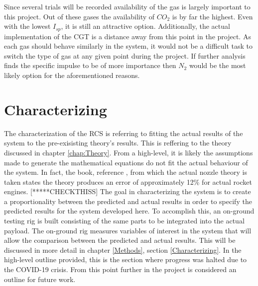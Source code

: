 Since several trials will be recorded availability of the gas is largely important to this project. Out of these gases the availability of $CO_2$ is by far the highest. Even with the lowest $I_{sp}$, it is still an attractive option. Additionally, the actual implementation of the CGT is a distance away from this point in the project. As each gas should behave similarly in the system, it would not be a difficult task to switch the type of gas at any given point during the project. If further analysis finds the specific impulse to be of more importance then $N_2$ would be the most likely option for the aforementioned reasons. 
\section{Characterizing}
The characterization of the RCS is referring to fitting the actual results of the system to the pre-exisisting theory's results. This is reffering to the theory discussed in chapter \ref{chap:Theory}. From a high-level, it is likely the assumptions made to generate the mathematical equations do not fit the actual behaviour of the system. In fact, the book, reference \cite{langton}, from which the actual nozzle theory is taken states the theory produces an error of approximately 12\% for actual rocket engines. [*****CHECKTHISS] The goal in characterizing the system is to create a proportionality between the predicted and actual results in order to specify the predicted results for the system developed here. To accomplish this, an on-ground testing rig is built consisting of the same parts to be integrated into the actual payload. The on-ground rig measures variables of interest in the system that will allow the comparison between the predicted and actual results. This will be discussed in more detail in chapter \ref{Methods}, section \ref{Characterizing}. In the high-level outline provided, this is the section where progress was halted due to the COVID-19 crisis. From this point further in the project is considered an outline for future work.
